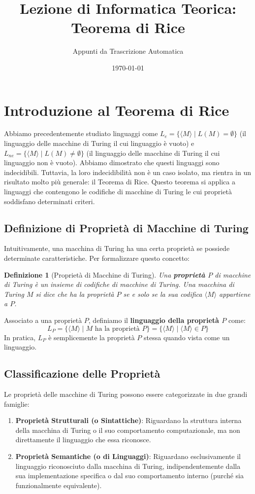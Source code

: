 \documentclass[a4paper]{article}
\title{Lezione di Informatica Teorica: Teorema di Rice}
\author{Appunti da Trascrizione Automatica}
\date{\today}
\newtheorem{definition}{Definizione}
\begin{document}
\maketitle
\tableofcontents
\newpage

\section{Introduzione al Teorema di Rice}

Abbiamo precedentemente studiato linguaggi come $L_e = \{\langle M \rangle \mid L(M) = \emptyset\}$ (il linguaggio delle macchine di Turing il cui linguaggio è vuoto) e $L_{ne} = \{\langle M \rangle \mid L(M) \neq \emptyset\}$ (il linguaggio delle macchine di Turing il cui linguaggio non è vuoto). Abbiamo dimostrato che questi linguaggi sono indecidibili. Tuttavia, la loro indecidibilità non è un caso isolato, ma rientra in un risultato molto più generale: il Teorema di Rice. Questo teorema si applica a linguaggi che contengono le codifiche di macchine di Turing le cui proprietà soddisfano determinati criteri.

\subsection{Definizione di Proprietà di Macchine di Turing}

Intuitivamente, una macchina di Turing ha una certa proprietà se possiede determinate caratteristiche. Per formalizzare questo concetto:

\begin{definition}[Proprietà di Macchine di Turing]
Una \textbf{proprietà $P$} di macchine di Turing è un insieme di codifiche di macchine di Turing.
Una macchina di Turing $M$ si dice che ha la proprietà $P$ se e solo se la sua codifica $\langle M \rangle$ appartiene a $P$.
\end{definition}

Associato a una proprietà $P$, definiamo il \textbf{linguaggio della proprietà $P$} come:
\[ L_P = \{ \langle M \rangle \mid M \text{ ha la proprietà } P \} = \{ \langle M \rangle \mid \langle M \rangle \in P \} \]
In pratica, $L_P$ è semplicemente la proprietà $P$ stessa quando vista come un linguaggio.

\subsection{Classificazione delle Proprietà}

Le proprietà delle macchine di Turing possono essere categorizzate in due grandi famiglie:
\begin{enumerate}
    \item \textbf{Proprietà Strutturali (o Sintattiche)}: Riguardano la struttura interna della macchina di Turing o il suo comportamento computazionale, ma non direttamente il linguaggio che essa riconosce.
    \item \textbf{Proprietà Semantiche (o di Linguaggi)}: Riguardano esclusivamente il linguaggio riconosciuto dalla macchina di Turing, indipendentemente dalla sua implementazione specifica o dal suo comportamento interno (purché sia funzionalmente equivalente).
\end{enumerate}
\end{document}
